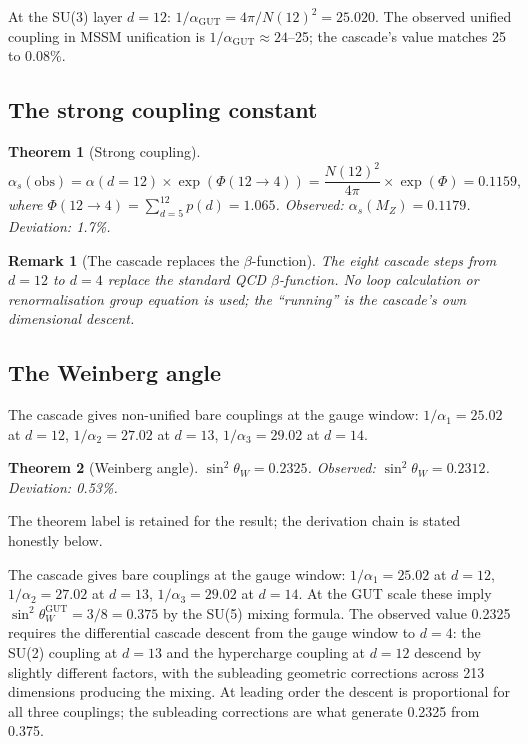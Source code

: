 \documentclass[12pt,a4paper]{article}
\newtheorem{theorem}{Theorem}[section]
\newtheorem*{remark}{Remark}
\begin{document}
At the SU(3) layer $d = 12$: $1/\alpha_{\text{GUT}} = 4\pi/N(12)^2 = 25.020$. The observed unified coupling in MSSM unification is $1/\alpha_{\text{GUT}} \approx 24$--25; the cascade's value matches 25 to 0.08\%.

\subsection{The strong coupling constant}

\begin{theorem}[Strong coupling]
\[
\alpha_s(\text{obs}) = \alpha(d = 12) \times \exp(\Phi(12 \to 4)) = \frac{N(12)^2}{4\pi} \times \exp(\Phi) = 0.1159,
\]
where $\Phi(12 \to 4) = \sum_{d=5}^{12} p(d) = 1.065$. Observed: $\alpha_s(M_Z) = 0.1179$. Deviation: 1.7\%.
\end{theorem}

\begin{remark}[The cascade replaces the $\beta$-function]
The eight cascade steps from $d = 12$ to $d = 4$ replace the standard QCD $\beta$-function. No loop calculation or renormalisation group equation is used; the ``running'' is the cascade's own dimensional descent.
\end{remark}

\subsection{The Weinberg angle}

The cascade gives non-unified bare couplings at the gauge window: $1/\alpha_1 = 25.02$ at $d = 12$, $1/\alpha_2 = 27.02$ at $d = 13$, $1/\alpha_3 = 29.02$ at $d = 14$.

\begin{theorem}[Weinberg angle]
$\sin^2\theta_W = 0.2325$. Observed: $\sin^2\theta_W = 0.2312$. Deviation: 0.53\%.
\end{theorem}

The theorem label is retained for the result; the derivation chain is stated honestly below.

The cascade gives bare couplings at the gauge window: $1/\alpha_1 = 25.02$ at $d = 12$, $1/\alpha_2 = 27.02$ at $d = 13$, $1/\alpha_3 = 29.02$ at $d = 14$. At the GUT scale these imply $\sin^2\theta_W^{\text{GUT}} = 3/8 = 0.375$ by the SU(5) mixing formula. The observed value 0.2325 requires the differential cascade descent from the gauge window to $d = 4$: the SU(2) coupling at $d = 13$ and the hypercharge coupling at $d = 12$ descend by slightly different factors, with the subleading geometric corrections across 213 dimensions producing the mixing. At leading order the descent is proportional for all three couplings; the subleading corrections are what generate 0.2325 from 0.375.
\end{document}
